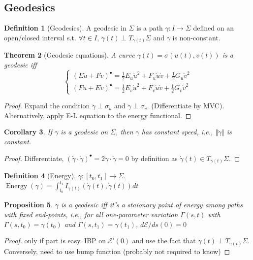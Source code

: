 \documentclass{article}
\theoremstyle{definition}
\newtheorem{defn}{Definition}[section]
\theoremstyle{remark}
\theoremstyle{plain}
\newtheorem{thm}[defn]{Theorem}
\newtheorem{prop}[defn]{Proposition}
\newtheorem{crly}[defn]{Corollary}
\theoremstyle{definition}
\begin{document}
\subsection{Geodesics}
\begin{defn}[Geodesics]
    A geodesic in $\Sigma$ is a path $\gamma:I\to\Sigma$ defined on an open/closed interval s.t. $\forall t\in I$, $\ddot{\gamma}(t)\perp T_{\gamma(t)}\Sigma$ and $\gamma$ is non-constant.
\end{defn}
\begin{thm}[Geodesic equations]
    A curve $\gamma(t)=\sigma(u(t),v(t))$ is a geodesic iff 
    \[\begin{cases}
    (E\dot u+F\dot v)^{\bullet}=\frac{1}{2} E_u\dot u^2+F_u\dot u\dot v+\frac{1}{2}G_u\dot v^2\\
    (F\dot u+ E\dot v)^\bullet = \frac{1}{2} E_v\dot u^2+F_v\dot u\dot v+\frac{1}{2}G_v\dot v^2
    \end{cases}\]
\end{thm}
\begin{proof}
    Expand the condition $\ddot{\gamma}\perp \sigma_u$ and $\ddot{\gamma}\perp\sigma_v$. (Differentiate by MVC). Alternatively, apply E-L equation to the energy functional.
\end{proof}
\begin{crly}
    If $\gamma$ is a geodesic on $\Sigma$, then $\gamma$ has constant speed, i.e., $\Vert\dot\gamma\Vert$ is constant.
\end{crly}
\begin{proof}
    Differentiate, $(\dot\gamma\cdot\dot\gamma)^\bullet=2\ddot\gamma\cdot\dot\gamma=0$ by definition as $\dot\gamma(t)\in T_{\gamma(t)}\Sigma$.
\end{proof}
\begin{defn}[Energy]
$\gamma:[t_0,t_1]\to\Sigma$.
    $\operatorname{Energy}(\gamma)=\int_{t_0}^{t_1}I_{\gamma(t)}(\dot\gamma(t),\dot\gamma(t))dt$
\end{defn}
\begin{prop}
    $\gamma$ is a geodesic iff it's a staionary point of energy among paths with fixed end-points, i.e., for all one-parameter variation $\Gamma(s,t)$ with $\Gamma(s,t_0)=\gamma(t_0)$ and $\Gamma(s,t_1)=\gamma(t_1)$, $d\mathcal{E}/ds(0)=0$
\end{prop}
\begin{proof}
    only if part is easy. IBP on $\mathcal{E}'(0)$ and use the fact that $\ddot\gamma(t)\perp T_{\gamma(t)}\Sigma$. Conversely, need to use bump function (probably not required to know)
\end{proof}
\end{document}
